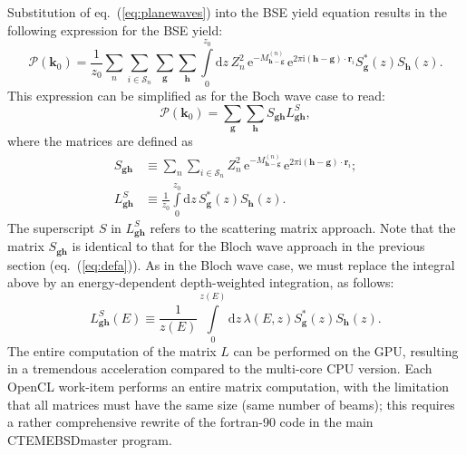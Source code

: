 \documentclass[DIV=calc, paper=letter, fontsize=11pt]{scrartcl}	 %
\begin{document}
Substitution of eq.~(\ref{eq:planewaves}) into the BSE yield equation results in the following expression 
for the BSE yield:
\begin{equation}
	\mathcal{P}(\mathbf{k}_0) = \frac{1}{z_0}\sum_{n}\sum_{i\in\mathcal{S}_n}\sum_{\mathbf{g}}\sum_{\mathbf{h}} \int\limits_{0}^{z_{0}} \mathrm{d}z\,
	 Z^2_n\,\mathrm{e}^{-M^{(n)}_{\mathbf{h}-\mathbf{g}}}\,\mathrm{e}^{2\pi\mathrm{i} (\mathbf{h}-\mathbf{g})\cdot\mathbf{r}_{i}} 
	S^{\ast}_{\mathbf{g}}(z) S_{\mathbf{h}}(z).
    \label{eq:prob2}
\end{equation}
This expression can be simplified as for the Boch wave case to read:
\begin{equation}
	\mathcal{P}(\mathbf{k}_0) = \sum_{\mathbf{g}}\sum_{\mathbf{h}} S_{\mathbf{g}\mathbf{h}} L^{S}_{\mathbf{g}\mathbf{h}},
    \label{eq:prob2}
\end{equation}
where the matrices are defined as
\begin{subequations}
\begin{align}
    S_{\mathbf{g}\mathbf{h}} &\equiv \sum_{n}\sum_{i\in\mathcal{S}_n} Z^2_n\,\mathrm{e}^{-M^{(n)}_{\mathbf{h}-\mathbf{g}}}\,\mathrm{e}^{2\pi\mathrm{i} 
    (\mathbf{h}-\mathbf{g})\cdot\mathbf{r}_{i}};\label{eq:defnewa}\\
    L^{S}_{\mathbf{g}\mathbf{h}} &\equiv \frac{1}
    {z_{0}}\int\limits_{0}^{z_{0}} \mathrm{d}z\,  S^{\ast}_{\mathbf{g}}(z) S_{\mathbf{h}}(z).
    \label{eq:defnewb}
\end{align}
\end{subequations}
The superscript $S$ in $L^{S}_{\mathbf{g}\mathbf{h}}$ refers to the scattering matrix approach.  Note that the matrix 
$S_{\mathbf{g}\mathbf{h}}$ is identical to that for the Bloch wave approach in the previous section (eq.~(\ref{eq:defa})).  
As in the Bloch wave case, we must replace the integral above by an energy-dependent depth-weighted integration, as follows:
\begin{equation}
	L^{S}_{\mathbf{g}\mathbf{h}}(E) \equiv  \frac{1}{z(E)}\int\limits_{0}^{z(E)} \mathrm{d}z\,  
    \lambda(E,z) S^{\ast}_{\mathbf{g}}(z) S_{\mathbf{h}}(z).
\end{equation}
The entire computation of the matrix $L$ can be performed on the GPU, resulting in a tremendous acceleration compared to the 
multi-core CPU version.  Each OpenCL work-item performs an entire matrix computation, with the limitation that all 
matrices must have the same size (same number of beams); this requires a rather comprehensive rewrite of the fortran-90 
code in the main \textsf{CTEMEBSDmaster} program.
\end{document}

